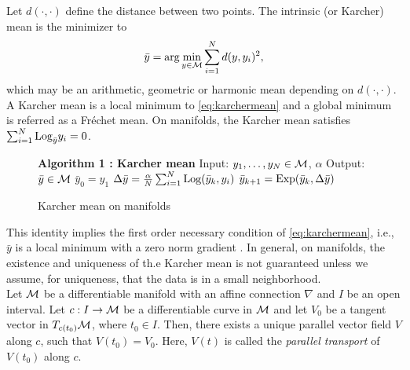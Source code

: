 Let $d(\cdot,\cdot)$ define the distance between two points. The intrinsic (or Karcher) mean is the minimizer to
{\small \begin{equation}
\label{eq:karchermean}
\bar{y} = \arg \min_{y \in \mathcal{M}} \sum_{i=1}^{N} d(y,y_{i})^{2}, 
\end{equation}}
which may be an arithmetic, geometric or harmonic mean depending on $d(\cdot,\cdot)$. A Karcher mean is a local minimum to \eqref{eq:karchermean} and a global minimum is referred as a Fr\'{e}chet mean. On manifolds, the Karcher mean satisfies $\sum_{i=1}^{N} \text{Log}_{\bar{y}}y_i =0$.

 \begin{figure}[H]
 \begin{center}
 \begin{minipage}{.45\linewidth} 
 \begin{algorithmic}[plain]
 \STATE \textbf{Algorithm 1 : Karcher mean}
 \STATE Input: $y_{1}, \ldots, y_{N} \in \mathcal{M}$, $\alpha$
 \STATE Output: $\bar{y} \in \mathcal{M}$
 \STATE $\bar{y}_{0} = y_{1}$
 \STATE $\Delta\bar{y} = \frac{\alpha}{N} \sum_{i=1}^{N}\text{Log} (\bar{y}_k,y_i)$
 \STATE $\bar{y}_{k+1} = \text{Exp}(\bar{y}_k,\Delta \bar{y})$
 \ENDWHILE
  \end{algorithmic}
  \end{minipage}
  \end{center}
 \caption{Karcher mean on manifolds}
     \label{alg:karcher} 
 \end{figure}
 
This identity implies the first order necessary condition of \eqref{eq:karchermean}, i.e., $\bar{y}$ is a local minimum with a zero norm gradient \cite{karcher1977riemannian}. In general, on manifolds, the existence and uniqueness of th.e Karcher mean is not guaranteed unless we assume, for uniqueness, that the data is in a small neighborhood.\\

Let $\mathcal{M}$ be a differentiable manifold with an affine connection $\nabla$ and $I$ be an open interval. Let $c:I \rightarrow \mathcal{M}$ be a differentiable curve in $\mathcal{M}$ and let $V_0$ be a tangent vector in $T_{c(t_0)}\mathcal{M}$, where $t_{0} \in I$. 
Then, there exists a unique parallel vector field $V$ along $c$, such that $V(t_0)=V_0$. Here, $V(t)$ is called the \textit{parallel transport} of $V(t_0)$ along $c$. 

